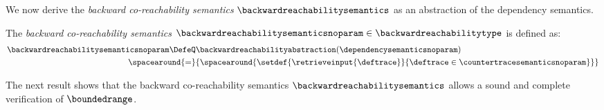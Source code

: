We now derive the \emph{backward co-reachability semantics} $\backwardreachabilitysemantics$ as an abstraction of the dependency semantics.

\begin{definition}
  The \emph{backward co-reachability semantics} $\backwardreachabilitysemanticsnoparam\in\backwardreachabilitytype$ is defined as:
  \begin{align*}
    \backwardreachabilitysemanticsnoparam\DefeQ& \backwardreachabilityabstraction(\dependencysemanticsnoparam) \\
    \spacearound{=}& \{\spacearound{\setdef{\retrieveinput{\deftrace}}{\deftrace \in \countertracesemanticsnoparam}}\}
  \end{align*}
\end{definition}

The next result shows that the backward co-reachability semantics $\backwardreachabilitysemantics$ allows a sound and complete verification of $\boundedrange$.

